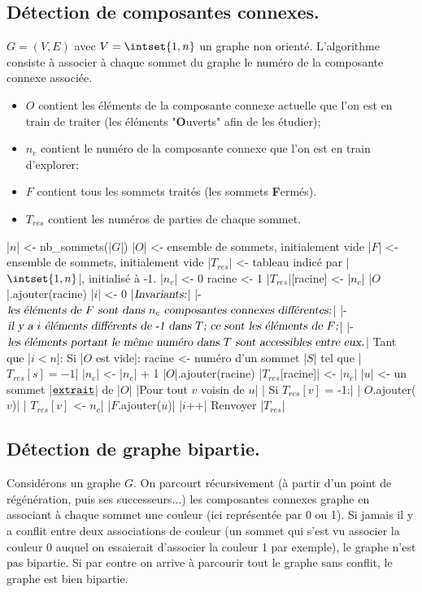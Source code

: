 \documentclass{scrartcl}
\begin{document}
		\subsection{Détection de composantes connexes.}
			$G = (V,E)$ avec $V = \intset{1,n}$ un graphe non orienté.
			L'algorithme consiste à associer à chaque sommet du graphe le numéro de la composante connexe associée.
			\begin{itemize}
				\item $O$ contient les éléments de la composante connexe actuelle que l'on est en train de traiter
					(les éléments "\textbf{O}uverts" afin de les étudier);
				\item $n_c$ contient le numéro de la composante connexe que l'on est en train d'explorer;
				\item $F$ contient tous les sommets traités (les sommets \textbf{F}ermés).
				\item $T_{res}$ contient les numéros de parties de chaque sommet.
			\end{itemize}
			\begin{algotext}
				|$n$| <- nb_sommets(|$G$|)
				|$O$| <- ensemble de sommets, initialement vide
				|$F$| <- ensemble de sommets, initialement vide
				|$T_{res}$| <- tableau indicé par |$\intset{1,n}$|, initialisé à -1.
				|$n_c$| <- 0 
				racine <- 1
				|$T_{res}$|[racine] <- |$n_c$|
				|$O$|.ajouter(racine)
				|$i$| <- 0
				|$\textsl{Invariants:}$|
					|- $ \textsl{les éléments de $F$ sont dans $n_c$ composantes connexes différentes;}$|
					|- $ \textsl{il y a $i$ éléments différents de -1 dans $T$; ce sont les éléments de $F$;}$|
					|- $ \textsl{les éléments portant le même numéro dans $T$ sont accessibles entre eux.}$|
				Tant que |$i < n$|:
					Si |$O$ est vide|:
						racine <- numéro d'un sommet |$S$| tel que |$T_{res}[s] = -1$|
						|$n_c$| <- |$n_c$| + 1
						|$O$|.ajouter(racine)
						|$T_{res}$[racine]| <- |$n_c$|
					|$u$| <- un sommet |$\texttt{\underline{extrait}}$| de |$O$|
					|Pour tout $v$ voisin de $u$|
					|	Si $T_{res}[v]$ = -1:|
					|		$O$.ajouter($v$)|
					|		$T_{res}[v]$ <- $n_c$|
					|$F$.ajouter($u$)|
					|$i$++|
				Renvoyer |$T_{res}$|
			\end{algotext}
		\subsection{Détection de graphe bipartie.}
			 Considérons un graphe $G$.
			On parcourt récursivement (à partir d'un point de régénération, puis ses successeurs...)
			les composantes connexes graphe en associant à chaque sommet une couleur (ici représentée par 0 ou 1).
			Si jamais il y a conflit entre deux associations de couleur 
			(un sommet qui s'est vu associer la couleur 0 auquel on essaierait d'associer la couleur 1 par exemple),
			le graphe n'est pas bipartie.
			Si par contre on arrive à parcourir tout le graphe sans conflit, le graphe est bien bipartie.
\end{document}

